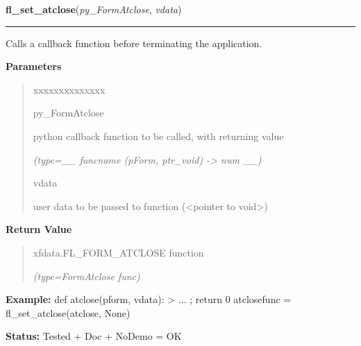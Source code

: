     \label{xformslib:library:fl_set_atclose}

    \vspace{0.5ex}

\hspace{.8\funcindent}\begin{boxedminipage}{\funcwidth}

    \raggedright \textbf{fl\_set\_atclose}(\textit{py\_FormAtclose}, \textit{vdata})

    \vspace{-1.5ex}

    \rule{\textwidth}{0.5\fboxrule}
\setlength{\parskip}{2ex}
    Calls a callback function before terminating the application.

\setlength{\parskip}{1ex}
      \textbf{Parameters}
      \vspace{-1ex}

      \begin{quote}
        \begin{Ventry}{xxxxxxxxxxxxxx}

          \item[py\_FormAtclose]

          python callback function to be called, with returning value

            {\it (type=\_\_ funcname (pForm, ptr\_void) -{\textgreater} num \_\_)}

          \item[vdata]

          user data to be passed to function ({\textless}pointer to 
          void{\textgreater})

        \end{Ventry}

      \end{quote}

      \textbf{Return Value}
    \vspace{-1ex}

      \begin{quote}
      xfdata.FL\_FORM\_ATCLOSE function

      {\it (type=FormAtclose func)}

      \end{quote}

\textbf{Example:} def atclose(pform, vdata): {\textgreater} ... ; return 0 atclosefunc = 
fl\_set\_atclose(atclose, None)



\textbf{Status:} Tested + Doc + NoDemo = OK



    \end{boxedminipage}

